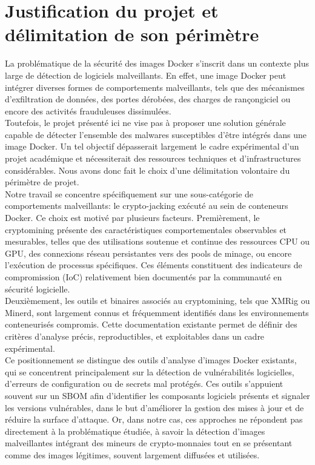 \section{Justification du projet et délimitation de son périmètre}
La problématique de la sécurité des images Docker s'inscrit dans un contexte plus large de détection de logiciels malveillants. En effet, une image Docker peut intégrer diverses formes de comportements malveillants, tels que des mécanismes d'exfiltration de données, des portes dérobées, des charges de rançongiciel ou encore des activités frauduleuses dissimulées. \\
\newline
Toutefois, le projet présenté ici ne vise pas à proposer une solution générale capable de détecter l'ensemble des malwares susceptibles d'être intégrés dans une image Docker. Un tel objectif dépasserait largement le cadre expérimental d'un projet académique et nécessiterait des ressources techniques et d'infrastructures considérables. Nous avons donc fait le choix d'une délimitation volontaire du périmètre de projet. \\
\newline
Notre travail se concentre spécifiquement sur une sous-catégorie de comportements malveillants: le crypto-jacking exécuté au sein de conteneurs Docker. Ce choix est motivé par plusieurs facteurs. Premièrement, le cryptomining présente des caractéristiques comportementales observables et mesurables, telles que des utilisations soutenue et continue des ressources CPU ou GPU, des connexions réseau persistantes vers des pools de minage, ou encore l'exécution de processus spécifiques. Ces éléments constituent des indicateurs de compromission (IoC) relativement bien documentés par la communauté en sécurité logicielle. \\
\newline
Deuxièmement, les outils et binaires associés au cryptomining, tels que XMRig ou Minerd, sont largement connus et fréquemment identifiés dans les environnements conteneurisés compromis. Cette documentation existante permet de définir des critères d'analyse précis, reproductibles, et exploitables dans un cadre expérimental. \\
\newline
Ce positionnement se distingue des outils d'analyse d'images Docker existants, qui se concentrent principalement sur la détection de vulnérabilités logicielles, d'erreurs de configuration ou de secrets mal protégés. Ces outils s'appuient souvent sur un SBOM afin d'identifier les composants logiciels présents et signaler les versions vulnérables, dans le but d'améliorer la gestion des mises à jour et de réduire la surface d'attaque. Or, dans notre cas, ces approches ne répondent pas directement à la problématique étudiée, à savoir la détection d'images malveillantes intégrant des mineurs de crypto-monnaies tout en se présentant comme des images légitimes, souvent largement diffusées et utilisées. \\

